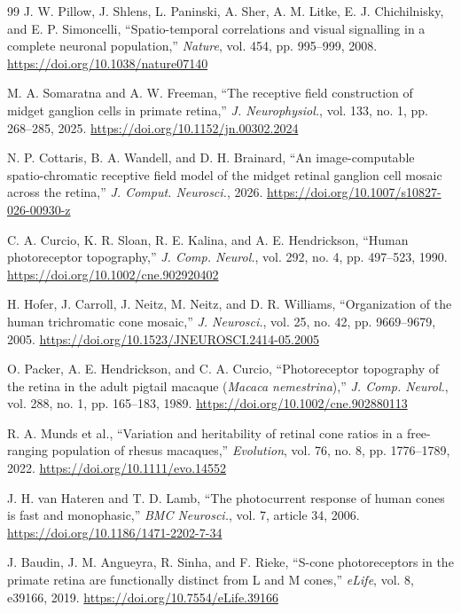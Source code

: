 \documentclass[a4paper,10pt,twocolumn,uplatex,dvipdfmx]{jsarticle}
\begin{document}
\begin{thebibliography}{99}
J. W. Pillow, J. Shlens, L. Paninski, A. Sher, A. M. Litke,
E. J. Chichilnisky, and E. P. Simoncelli,
``Spatio-temporal correlations and visual signalling in a complete
neuronal population,''
\textit{Nature}, vol. 454, pp. 995--999, 2008.
\url{https://doi.org/10.1038/nature07140}

M. A. Somaratna and A. W. Freeman,
``The receptive field construction of midget ganglion cells in primate retina,''
\textit{J. Neurophysiol.}, vol. 133, no. 1, pp. 268--285, 2025.
\url{https://doi.org/10.1152/jn.00302.2024}

N. P. Cottaris, B. A. Wandell, and D. H. Brainard,
``An image-computable spatio-chromatic receptive field model of the
midget retinal ganglion cell mosaic across the retina,''
\textit{J. Comput. Neurosci.}, 2026.
\url{https://doi.org/10.1007/s10827-026-00930-z}

C. A. Curcio, K. R. Sloan, R. E. Kalina, and A. E. Hendrickson,
``Human photoreceptor topography,''
\textit{J. Comp. Neurol.}, vol. 292, no. 4, pp. 497--523, 1990.
\url{https://doi.org/10.1002/cne.902920402}

H. Hofer, J. Carroll, J. Neitz, M. Neitz, and D. R. Williams,
``Organization of the human trichromatic cone mosaic,''
\textit{J. Neurosci.}, vol. 25, no. 42, pp. 9669--9679, 2005.
\url{https://doi.org/10.1523/JNEUROSCI.2414-05.2005}

O. Packer, A. E. Hendrickson, and C. A. Curcio,
``Photoreceptor topography of the retina in the adult pigtail macaque
(\textit{Macaca nemestrina}),''
\textit{J. Comp. Neurol.}, vol. 288, no. 1, pp. 165--183, 1989.
\url{https://doi.org/10.1002/cne.902880113}

R. A. Munds et al.,
``Variation and heritability of retinal cone ratios in a free-ranging
population of rhesus macaques,''
\textit{Evolution}, vol. 76, no. 8, pp. 1776--1789, 2022.
\url{https://doi.org/10.1111/evo.14552}

J. H. van Hateren and T. D. Lamb,
``The photocurrent response of human cones is fast and monophasic,''
\textit{BMC Neurosci.}, vol. 7, article 34, 2006.
\url{https://doi.org/10.1186/1471-2202-7-34}

J. Baudin, J. M. Angueyra, R. Sinha, and F. Rieke,
``S-cone photoreceptors in the primate retina are functionally distinct
from L and M cones,''
\textit{eLife}, vol. 8, e39166, 2019.
\url{https://doi.org/10.7554/eLife.39166}


\end{thebibliography}
\end{document}
